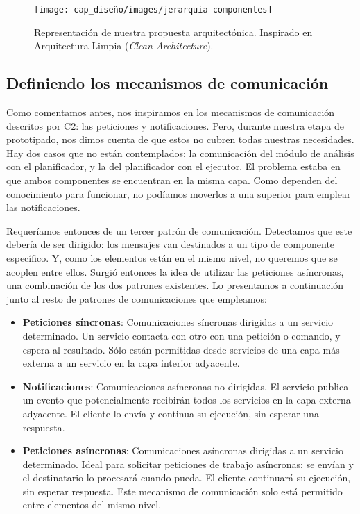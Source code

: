 \begin{figure}[htb]
  \centering
  \texttt{[image: cap\_diseño/images/jerarquia-componentes]}
  \caption[Representación de nuestra propuesta arquitectónica. Inspirado en Arquitectura Limpia (\emph{Clean Architecture}).]{Representación de nuestra propuesta arquitectónica. Inspirado en Arquitectura Limpia (\emph{Clean Architecture}). \footnotemark }
  \label{fig:clean-mapek-architecture}
\end{figure}


\subsection{Definiendo los mecanismos de comunicación}

Como comentamos antes, nos inspiramos en los mecanismos de comunicación descritos por C2: las peticiones y notificaciones. Pero, durante nuestra etapa de prototipado, nos dimos cuenta de que estos no cubren todas nuestras necesidades. Hay dos casos que no están contemplados: la comunicación del módulo de análisis con el planificador, y la del planificador con el ejecutor. El problema estaba en que ambos componentes se encuentran en la misma capa. Como dependen del conocimiento para funcionar, no podíamos moverlos a una superior para emplear las notificaciones.

Requeríamos entonces de un tercer patrón de comunicación. Detectamos que este debería de ser dirigido: los mensajes van destinados a un tipo de componente específico. Y, como los elementos están en el mismo nivel, no queremos que se acoplen entre ellos. Surgió entonces la idea de utilizar las peticiones asíncronas, una combinación de los dos patrones existentes. Lo presentamos a continuación junto al resto de patrones de comunicaciones que empleamos:

\begin{itemize}
  \item \textbf{Peticiones síncronas}: Comunicaciones síncronas dirigidas a un servicio determinado. Un servicio contacta con otro con una petición o comando, y espera al resultado. Sólo están permitidas desde servicios de una capa más externa a un servicio en la capa interior adyacente.

  \item \textbf{Notificaciones}: Comunicaciones asíncronas no dirigidas. El servicio publica un evento que potencialmente recibirán todos los servicios en la capa externa adyacente. El cliente lo envía y continua su ejecución, sin esperar una respuesta.

  \item \textbf{Peticiones asíncronas}: Comunicaciones asíncronas dirigidas a un servicio determinado. Ideal para solicitar peticiones de trabajo asíncronas: se envían y el destinatario lo procesará cuando pueda. El cliente continuará su ejecución, sin esperar respuesta. Este mecanismo de comunicación solo está permitido entre elementos del mismo nivel.

\end{itemize}

